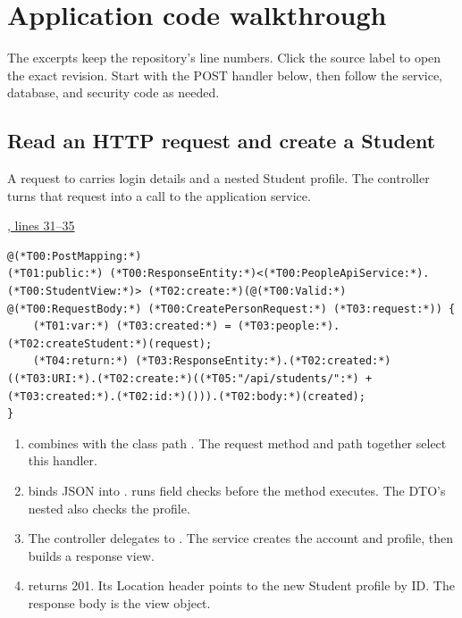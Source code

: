 \clearpage
\section{Application code walkthrough}\label{sec:code}
The excerpts keep the repository's line numbers. Click the source label to open
the exact revision. Start with the POST handler below, then follow the service,
database, and security code as needed.

\subsection{Read an HTTP request and create a Student}
A request to  carries login details and a nested Student
profile. The controller turns that request into a call to the application service.

\par\smallskip
{\small\href{\repo/blob/5d22aed7f6d4ef1e4c0b0c0dabf2962ba4b47608/src/main/java/com/example/fmschool/controller/StudentController.java#L31-L35}{, lines 31--35}}
\begin{lstlisting}[style=vsJava,firstnumber=31]
@(*T00:PostMapping:*)
(*T01:public:*) (*T00:ResponseEntity:*)<(*T00:PeopleApiService:*).(*T00:StudentView:*)> (*T02:create:*)(@(*T00:Valid:*) @(*T00:RequestBody:*) (*T00:CreatePersonRequest:*) (*T03:request:*)) {
    (*T01:var:*) (*T03:created:*) = (*T03:people:*).(*T02:createStudent:*)(request);
    (*T04:return:*) (*T03:ResponseEntity:*).(*T02:created:*)((*T03:URI:*).(*T02:create:*)((*T05:"/api/students/":*) + (*T03:created:*).(*T02:id:*)())).(*T02:body:*)(created);
}
\end{lstlisting}


\begin{enumerate}
\item {} combines with the class path .
The request method and path together select this handler.
\item {} binds JSON into .
 runs field checks before the method executes. The DTO's nested
 also checks the profile.
\item The controller delegates to .
The service creates the account and profile, then builds a response view.
\item {} returns 201. Its Location header points to
the new Student profile by ID. The response body is the view object.
\end{enumerate}

